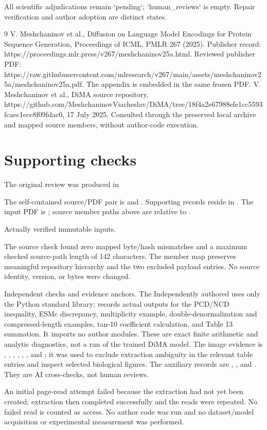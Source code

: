 \documentclass[10pt]{article}
\begin{document}
All scientific adjudications remain `pending`; `human\_reviews` is empty. Repair verification and author adoption are distinct states.\par
9 V. Meshchaninov et al., Diffusion on Language Model Encodings for Protein Sequence Generation, Proceedings of ICML, PMLR 267 (2025). Publisher record: https://proceedings.mlr.press/v267/meshchaninov25a.html. Reviewed publisher PDF: https://raw.githubusercontent.com/mlresearch/v267/main/assets/meshchaninov25a/meshchaninov25a.pdf. The appendix is embedded in the same frozen PDF. V. Meshchaninov et al., DiMA source repository, https://github.com/MeshchaninovViacheslav/DiMA/tree/18f4a2e67988efe1cc5593fcaec1ece8f09fdac0, 17 July 2025. Consulted through the preserved local archive and mapped source members, without author-code execution.\par
\section*{Supporting checks}
The original review was produced in\par
The self-contained source/PDF pair is and . Supporting records reside in . The input PDF is ; source member paths above are relative to .\par
Actually verified immutable inputs.\par
The source check found zero mapped byte/hash mismatches and a maximum checked source-path length of 142 characters. The member map preserves meaningful repository hierarchy and the two excluded payload entries. No source identity, version, or bytes were changed.\par
Independent checks and evidence anchors. The Independently authored uses only the Python standard library; records actual outputs for the PCD/NCD inequality, ESMc discrepancy, multiplicity example, double-denormalization and compressed-length examples, tan-10 coefficient calculation, and Table 13 summation. It imports no author modules. These are exact finite arithmetic and analytic diagnostics, not a run of the trained DiMA model. The image evidence is , , , , , , and ; it was used to exclude extraction ambiguity in the relevant table entries and inspect selected biological figures. The auxiliary records are , , and . They are AI cross-checks, not human reviews.\par
An initial page-read attempt failed because the extraction had not yet been created; extraction then completed successfully and the reads were repeated. No failed read is counted as access. No author code was run and no dataset/model acquisition or experimental measurement was performed.\par
\end{document}
